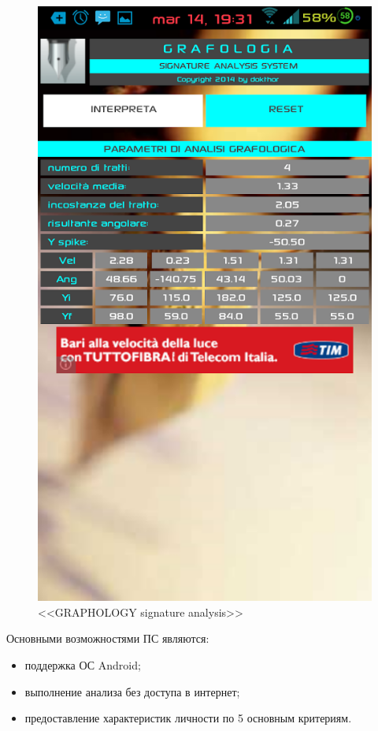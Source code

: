 \begin{figure}[h]
    \centering
    \includegraphics[height=0.5\textheight]{figures/analog_graphology_sign_analysis.png}
    \caption{<<GRAPHOLOGY signature analysis>>}
    \label{fig:domain:analog:graphology_sign_analysis}
\end{figure}

Основными возможностями ПС являются:
\begin{itemize}
  \item поддержка ОС Android;
  \item выполнение анализа без доступа в интернет;
  \item предоставление характеристик личности по 5 основным критериям.
\end{itemize}

